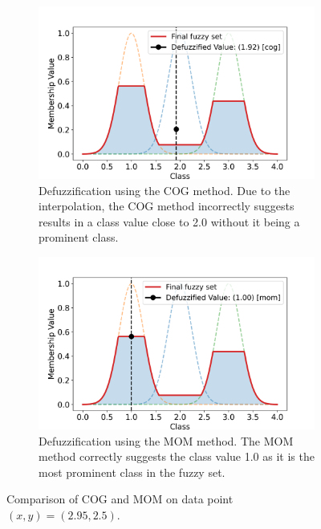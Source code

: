 \begin{figure}[H]
    \centering
    \begin{subfigure}[t]{0.48\textwidth}
        \centering
        \includegraphics[width=\textwidth,trim={0 0 0 1cm},clip]{figures/ProofOfConcepts/fuzzy_set_for_data_cog.png}
        \caption[Resulting Fuzzy Set after applying the Rules on specific Data, COG Method]{Defuzzification using the COG method. Due to the interpolation, the COG method incorrectly suggests results in a class value close to 2.0 without it being a prominent class.}
        \label{fig:fuzzySetForDataCOG}
    \end{subfigure}
    \hfill
    \begin{subfigure}[t]{0.48\textwidth}
        \centering
        \includegraphics[width=\textwidth,trim={0 0 0 1cm},clip]{figures/ProofOfConcepts/fuzzy_set_for_data_mom.png}
        \caption[Resulting Fuzzy Set after applying the Rules on specific Data, MOM Method]{Defuzzification using the MOM method. The MOM method correctly suggests the class value 1.0 as it is the most prominent class in the fuzzy set.}
        \label{fig:fuzzySetForDataMOM}
    \end{subfigure}
    \caption{Comparison of COG and MOM on data point $(x,y)=(2.95, 2.5)$. }
    \label{fig:fuzzySetComparison}
\end{figure}


